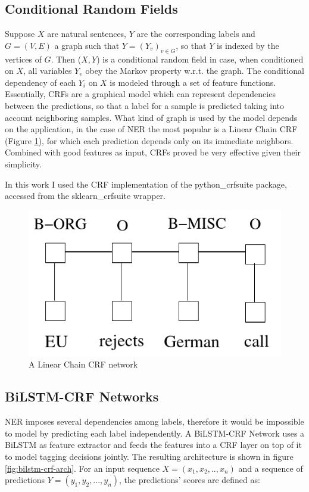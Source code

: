 \documentclass[journal]{IEEEtran}
\begin{document}
\subsection{Conditional Random Fields}
Suppose $X$ are natural sentences, $Y$ are the corresponding labels and $G = (V,E)$ a graph such that $Y=(Y_v)_{v \in G}$, so that $Y$ is indexed by the vertices of $G$. Then ($X,Y$) is a conditional random field \cite{laffertyCrf} in case, when conditioned on $X$, all variables $Y_v$ obey the Markov property w.r.t. the graph.
The conditional dependency of each $Y_i$ on $X$ is modeled through a set of feature functions.
Essentially, CRFs are a graphical model which can represent dependencies between the predictions, so that a label for a sample is predicted taking into account neighboring samples. What kind of graph is used by the model depends on the application, in the case of NER the most popular is a Linear Chain CRF (Figure \ref{fig:crf-net}), for which each prediction depends only on its immediate neighbors.
Combined with good features as input, CRFs proved be very effective given their simplicity.

In this work I used the CRF implementation of the python\_crfsuite package, accessed from the sklearn\_crfsuite wrapper.

\begin{figure}[h]
    \centering
    \includegraphics[scale=0.4]{Figures/crf.png}
    \caption{A Linear Chain CRF network}
    \label{fig:crf-net}
\end{figure}


\subsection{BiLSTM-CRF Networks}
NER imposes several dependencies among labels, therefore it would be impossible to model by predicting each label independently. A BiLSTM-CRF Network \cite{lample2016neural} uses a BiLSTM as feature extractor and feeds the features into a CRF layer on top of it to model tagging decisions jointly. The resulting architecture is shown in figure \ref{fig:bilstm-crf-arch}.
For an input sequence $X=(x_1,x_2,..,x_n)$ and a sequence of predictions $Y=(y_1,y_2,...,y_n)$, the predictions' scores are defined as:
\end{document}

